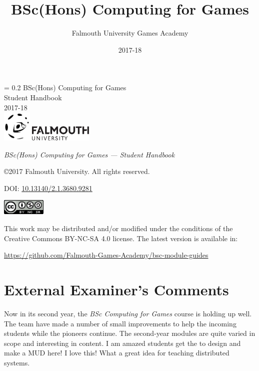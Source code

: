 \documentclass[10pt, a5paper, twoside, openright, titlepage]{memoir}\usepackage{etoolbox}\newtoggle{printable}\toggletrue{printable}\newtoggle{isBeamer}\togglefalse{isBeamer}
\author{Falmouth University Games Academy}
\title{BSc(Hons) Computing for Games}
\date{2017-18}
\newcommand*{\FSfont}[1]{\fontencoding{T1}\fontfamily{#1}\selectfont}
\newcommand*{\titleRF}{
\begingroup%
\drop = 0.2\textheight
\centering
{\vspace{1cm}
\huge BSc(Hons) Computing for Games}\\[\baselineskip]
{\Huge Student Handbook}\\[\baselineskip]
{\large 2017-18}\\[0.5\drop]
\vfill
{\includegraphics[height=4em]{GamesLogoAt}	
\includegraphics[height=2em]{FalmouthLogo}}\\[0.5\baselineskip]
\endgroup}
\newlength{\drop}%
\begin{document}
\thispagestyle{empty}
\titleRF
\pagebreak

\thispagestyle{empty}
\null\vfill

\begin{small}
\begin{flushleft}
\textit{BSc(Hons) Computing for Games --- Student Handbook}

\copyright  2017 Falmouth University. All rights reserved.

\bigskip

DOI: \url{10.13140/2.1.3680.9281}

\vspace{3em}

\includegraphics[height=2em]{ccbyncnd4-88x31}	

\footnotesize This work may be distributed and/or modified under the conditions of the Creative Commons BY-NC-SA 4.0 license. The latest version is available in:

\smallskip

\url{https://github.com/Falmouth-Games-Academy/bsc-module-guides}

\end{flushleft}
\end{small}



\frontmatter

\begin{small}
	\addtolength{\voffset}{-3.2cm}
	\addtolength{\textheight}{3.2cm}
	\tableofcontents
\end{small}

\newpage

\section*{External Examiner's Comments}

Now in its second year, the \textit{BSc Computing for Games} course is holding up well. The team have made a number of small improvements to help the incoming students while the pioneers continue. The second-year modules are quite varied in scope and interesting in content. I am amazed students get the to design and make a MUD here! I love this! What a great idea for teaching distributed systems.\\
\end{document}
